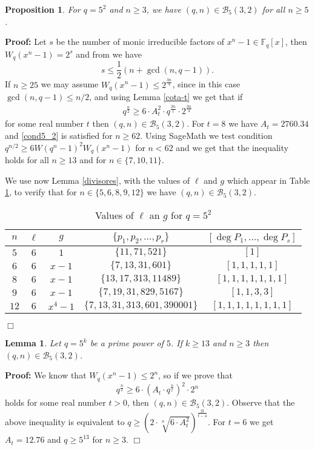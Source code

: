 \documentclass[12pt]{article}
\newtheorem{lemma}[theorem]{Lemma}
\newtheorem{proposition}[theorem]{Proposition}
\newenvironment{proof}{\noindent \textbf{Proof: }}{\hfill
$\Box$  \vspace{1ex}}
\newcommand{\F}{\mathbb{F}}
\begin{document}
\begin{proposition}\label{case5_2}
For $q=5^2$ and $n \geq 3$, we have $(q,n) \in \mathcal{B}_5(3,2)$
for all $n \geq 5$.
\end{proposition}
\begin{proof} 
Let $s$ be the number of monic irreducible factors of 
$x^n-1 \in \F_q[x]$, then $W_q(x^n-1) = 2^s$ and  
from	\cite[Inequality (2.10)]{Lenstra} we have 
$$
s \leq \frac{1}{2} \left( n + \gcd(n,q-1) \right).
$$
If $n \geq 25$ we
may assume $W_q(x^n-1) \leq 2^{\frac{3n}{4}}$, since in this case
$\gcd(n,q-1) \leq n/2$, and using Lemma \ref{cota-t} we get that  if 
\begin{eqnarray}\label{cond5_2}
q^{\frac{n}{2}} \geq 6 \cdot A_t^2 \cdot q^{\frac{2n}{t}} \cdot 2^{\frac{3n}{4}}
\end{eqnarray}
for some real number $t$ then 
$(q,n) \in \mathcal{B}_5(3,2)$.
For $t=8$ we have $A_t=2760.34$ and
\eqref{cond5_2} is satisfied for
$n\geq 62$. 
Using SageMath we test condition
$q^{n/2} \geq 6 W(q^{n}-1)^2 W_q(x^n-1)$ for $n<62$  and we get
that the inequality holds for all
$n \geq 13$ and for
$n \in \{ 7,10,11\}$.

We use now  Lemma \ref{divisores}, with the values of $\ell$ and $g$ which 
appear in Table \ref{Delta5_2}, to verify that
for $n \in \{5,6,8,9,12\}$ we have $(q,n) \in \mathcal{B}_5(3,2)$.

\begin{table}[h]
\centering
\begin{tabular}{ccccc}
$n$  & $\ell$ & $g$ & $\{p_1,p_2,\ldots ,p_r\}$ &  $[\deg P_1 , \ldots , \deg 
P_s]$\\
\hline
$5$ & $6$ & $1$
			& $\{ 11 , 71 , 521 \}$ & $[1]$ \\
$6$ & $6$ & $x-1$
			& $\{ 7 , 13 , 31 , 601 \}$ & $[1,1,1,1,1]$ \\
$8$ & $6$ & $x - 1$
			& $\{ 13 , 17 , 313 , 11489 \}$ & $[1,1,1,1,1,1,1]$ \\
$9$ & $6$ & $x-1$
			& $\{ 7 , 19 , 31 , 829 , 5167 \}$ & $[1,1,3,3]$ \\
$12$ & $6$ & $x^4-1$
			& $\{ 7,13,31,313,601,390001 \}$ & $[1,1,1,1,1,1,1,1]$
\end{tabular}
\caption{Values of $\ell$ an $g$ for $q=5^2$}
\label{Delta5_2}
\end{table}	
\end{proof}


\begin{lemma}\label{case5_3}
Let $q=5^k$ be a prime power of $5$.
If $k \geq 13$ and $n \geq 3$ then $(q,n) \in \mathcal{B}_5(3,2)$.
\end{lemma}
\begin{proof}
We know that
$W_q(x^n-1)\leq 2^n$, so if we prove  that
$$
q^{\frac{n}{2}} \geq 6 \cdot (A_t \cdot q^{\frac{n}{t}})^2 \cdot 2^n
$$
holds for some real number $t > 0$, then
$(q,n) \in \mathcal{B}_5(3,2)$. Observe that the above inequality is equivalent 
to
$q \geq 
\left(
2 \cdot \sqrt[n]{6 \cdot A_t^2}
\right)^{\frac{2t}{t-4}}$.
For $t=6$ we get $A_t=12.76$ and $q \geq 5^{13}$ for $n \geq 3$.
\end{proof}
\end{document}
